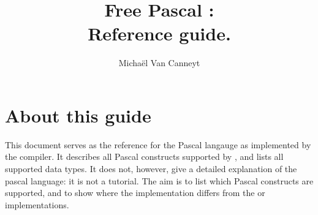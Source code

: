 %
%
%
%
%

\begin{latexonly}
  \ifpdf
  \fi
\end{latexonly}

%
%
\makeindex
%
%
\usepackage{syntax}

%
%

\title{Free Pascal :\\ Reference guide.}

\author{Micha\"el Van Canneyt}
\maketitle
\tableofcontents
\newpage
\listoftables
\newpage




\section*{About this guide}
This document serves as the reference for the Pascal langauge as implemented
by the \fpc compiler. It describes all Pascal constructs supported by 
\fpc, and lists all supported data types. It does not, however, give a 
detailed explanation of the pascal language: it is not a tutorial. 
The aim is to list which Pascal constructs are supported, and to show 
where the \fpc implementation differs from the \tp or \delphi implementations.

